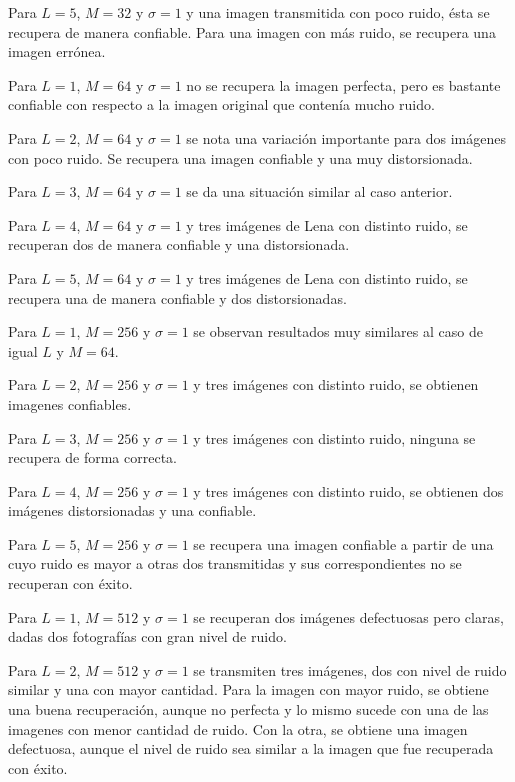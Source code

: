 \documentclass[10pt,journal,compsoc]{IEEEtran}
\begin{document}
Para $L = {5}$, $M = {32}$ y $\sigma = 1$ y una imagen transmitida con poco ruido, \'esta se recupera de manera confiable. Para una imagen con m\'as ruido, se recupera una imagen err\'onea.

Para $L = {1}$, $M = {64}$ y $\sigma = 1$ no se recupera la imagen perfecta, pero es bastante confiable con respecto a la imagen original que conten\'ia mucho ruido.

Para $L = {2}$, $M = {64}$ y $\sigma = 1$ se nota una variaci\'on importante para dos im\'agenes con poco ruido. Se recupera una imagen confiable y una muy distorsionada.

Para $L = {3}$, $M = {64}$ y $\sigma = 1$ se da una situaci\'on similar al caso anterior.

Para $L = {4}$, $M = {64}$ y $\sigma = 1$ y tres im\'agenes de Lena con distinto ruido, se recuperan dos de manera confiable y una distorsionada.

Para $L = {5}$, $M = {64}$ y $\sigma = 1$ y tres im\'agenes de Lena con distinto ruido, se recupera una de manera confiable y dos distorsionadas.

Para $L = {1}$, $M = {256}$ y $\sigma = 1$ se observan resultados muy similares al caso de igual $L$ y $M = {64}$.

Para $L = {2}$, $M = {256}$ y $\sigma = 1$ y tres im\'agenes con distinto ruido, se obtienen imagenes confiables.

Para $L = {3}$, $M = {256}$ y $\sigma = 1$ y tres im\'agenes con distinto ruido, ninguna se recupera de forma correcta.

Para $L = {4}$, $M = {256}$ y $\sigma = 1$ y tres im\'agenes con distinto ruido, se obtienen dos im\'agenes distorsionadas y una confiable.

Para $L = {5}$, $M = {256}$ y $\sigma = 1$ se recupera una imagen confiable a partir de una cuyo ruido es mayor a otras dos transmitidas y sus correspondientes no se recuperan con \'exito.

Para $L = {1}$, $M = {512}$ y $\sigma = 1$ se recuperan dos im\'agenes defectuosas pero claras, dadas dos fotograf\'ias con gran nivel de ruido.

Para $L = {2}$, $M = {512}$ y $\sigma = 1$ se transmiten tres im\'agenes, dos con nivel de ruido similar y una con mayor cantidad. Para la imagen con mayor ruido, se obtiene una buena recuperaci\'on, aunque no perfecta y lo mismo sucede con una de las imagenes con menor cantidad de ruido. Con la otra, se obtiene una imagen defectuosa, aunque el nivel de ruido sea similar a la imagen que fue recuperada con \'exito.
\end{document}
